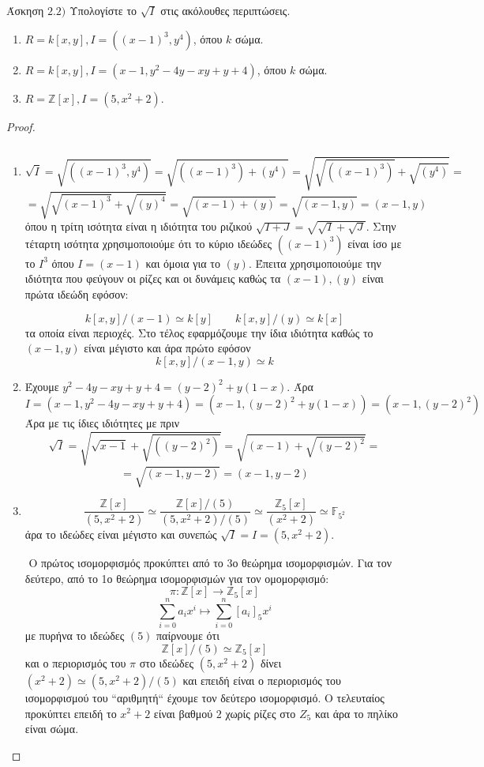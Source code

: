 \documentclass[oneside,a4paper]{article}
\newcommand {\tl}{\textlatin}
\newcommand{\Z}{\mathbb{Z}}
\begin{document}
\noindent Άσκηση $2.2)$
\quad Υπολογίστε το $\sqrt I$ στις ακόλουθες περιπτώσεις.
\begin{enumerate}
    \item $R = k[x,y], I = ((x-1)^3,y^4)$, όπου $k$ σώμα.
    \item $R = k[x,y], I = (x-1,y^2 - 4y -xy + y + 4)$, όπου $k$ σώμα.
    \item $R = \Z [x], I = (5,x^2 + 2)$. 
\end{enumerate}
\begin{proof} $ $

	$ $\newline

	\begin{enumerate}
		\item 
		$$\sqrt I = \sqrt{\left((x-1)^3,y^4 \right)} = \sqrt{ \left((x-1)^3\right) + (y^4)} = \sqrt{ \sqrt{\left((x-1)^3\right)} + \sqrt{(y^4)}  } =$$
		$$ = \sqrt{\sqrt{\left(x-1\right)^3}  + \sqrt{(y)^4}   } = \sqrt{ (x-1) + (y)} = \sqrt{ (x-1,y) } = (x-1,y)$$
		όπου η τρίτη ισότητα είναι η ιδιότητα του ριζικού $\sqrt{I + J} = \sqrt{\sqrt I + \sqrt J}$. Στην τέταρτη ισότητα χρησιμοποιούμε ότι το κύριο ιδεώδες $((x-1)^3)$ είναι ίσο με το $I^3$ όπου $I=(x-1)$ και όμοια για το $(y)$. Έπειτα χρησιμοποιούμε την ιδιότητα που φεύγουν οι ρίζες και οι δυνάμεις καθώς τα $(x-1),(y)$ είναι πρώτα ιδεώδη εφόσον:

		$$ k[x,y]/(x-1) \simeq k[y] \quad \quad k[x,y]/(y) \simeq k[x]$$
		τα οποία είναι περιοχές. Στο τέλος εφαρμόζουμε την ίδια ιδιότητα καθώς το $(x-1,y)$ είναι μέγιστο και άρα πρώτο εφόσον
		$$k[x,y]/(x-1,y) \simeq k$$

		\item Έχουμε $y^2 -4y -xy + y +4 = (y-2)^2 + y(1-x)$. Άρα 
		$$I = (x-1,y^2 -4y -xy +y +4) = (x-1,(y-2)^2 +y(1-x)) = (x-1,(y-2)^2)$$
		Άρα με τις ίδιες ιδιότητες με πριν
		$$\sqrt{I} = \sqrt{\sqrt{x-1} + \sqrt{\left((y-2)^2\right)}} = \sqrt{ (x-1) + \sqrt{(y-2)^2}} = $$
		$$ = \sqrt{(x-1,y-2)} = (x-1,y-2)$$

		\item 
		$$\frac{\Z[x]}{(5,x^2+2)} \simeq \frac{\Z [x] /(5)}{(5,x^2+2) /(5)} \simeq \frac{\Z_5 [x]}{(x^2+2)} \simeq \mathbb{F}_{5^2}$$
		άρα το ιδεώδες είναι μέγιστο και συνεπώς $\sqrt{I} = I = (5,x^2+2)$.

		$ $\newline
		Ο πρώτος ισομορφισμός προκύπτει από το 3ο θεώρημα ισομορφισμών. Για τον δεύτερο, από το 1ο θεώρημα ισομορφισμών για τον ομομορφισμό:
		$$\pi : \Z [x] \longrightarrow \Z_5[x]$$
		$$\sum\limits_{i=0}^n a_i x^i \longmapsto \sum\limits_{i=0}^n [a_i]_5 x^i$$
		με πυρήνα το ιδεώδες $(5)$ παίρνουμε ότι
		$$\Z[x]/(5) \simeq \Z_5[x]$$
		και ο περιορισμός του $\pi$ στο ιδεώδες $(5,x^2+2)$ δίνει $(x^2+2) \simeq (5,x^2+2)/(5)$ και επειδή είναι ο περιορισμός του ισομορφισμού του \tl{``}αριθμητή\tl{``} έχουμε τον δεύτερο ισομορφισμό. Ο τελευταίος προκύπτει επειδή το $x^2+2$ είναι βαθμού $2$ χωρίς ρίζες στο $Z_5$ και άρα το πηλίκο είναι σώμα.
	\end{enumerate}


\end{proof}
\end{document}
